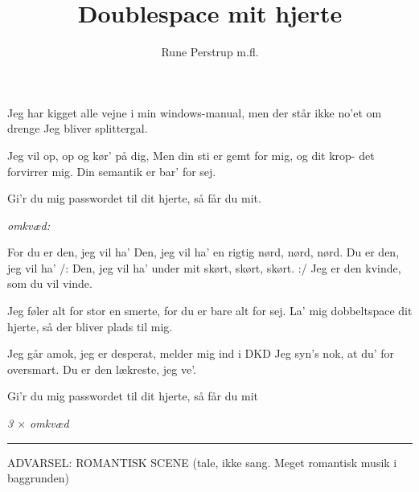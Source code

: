 \documentclass[10pt]{article}
\title{Doublespace mit hjerte}
\author{Rune Perstrup m.fl.}
\begin{document}
\begin{song}
Jeg har kigget alle vejne
        i min windows-manual,                  
        men der står ikke no'et om drenge
        Jeg bliver splittergal.

  Jeg vil op,
        op og kør' på dig,
        Men din sti er gemt for mig,
        og dit krop-
                \qquad[sprog]
        det forvirrer mig.
        Din semantik er bar' for sej.

  Gi'r du mig passwordet til dit hjerte, så får du mit.

{\em omkvæd:}

%
        For du er den, jeg vil ha'
 Den, jeg vil ha'
        en rigtig nørd, nørd, nørd.
        Du er den, jeg  vil ha'
 /: Den, jeg vil ha'
        under mit skørt, skørt, skørt. :/
  Jeg er den kvinde,
        som du vil vinde.

  Jeg føler alt for stor en smerte,
        for du er bare alt for sej.
        La' mig dobbeltspace dit hjerte,
        så der bliver plads til mig.

  Jeg går amok,
        jeg er desperat,
        melder mig ind i DKD
        Jeg syn's nok,
        at du' for oversmart.
        Du er den lækreste, jeg ve'.

  Gi'r du mig passwordet til dit hjerte, så får du mit

{\em 3 $\times$ omkvæd}
\end{song}


\scene
\hrule

ADVARSEL: ROMANTISK SCENE (tale, ikke sang. Meget romantisk musik i
baggrunden)
\end{document}
